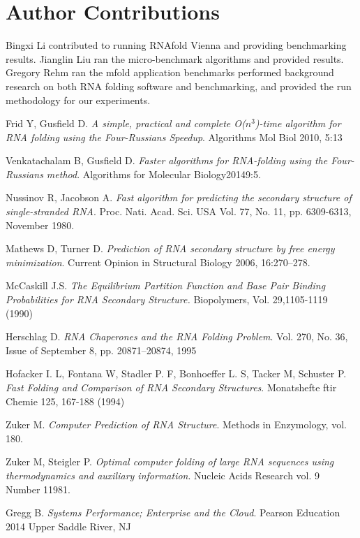 \documentclass[12pt]{article}
\begin{document}
\section{Author Contributions}
Bingxi Li contributed to running RNAfold Vienna and providing benchmarking results. Jianglin Liu ran the
micro-benchmark algorithms and provided results. Gregory Rehm ran the mfold application benchmarks
performed background research on both RNA folding software and benchmarking, and provided the run methodology
for our experiments.
\begin{thebibliography}{56}
Frid Y, Gusfield D.
\textit{A simple, practical and complete O($n^3$)-time
algorithm for RNA folding using the Four-Russians Speedup}.
Algorithms Mol Biol 2010, 5:13

Venkatachalam B, Gusfield D.
\textit{Faster algorithms for RNA-folding using the Four-Russians method}.
Algorithms for Molecular Biology20149:5.

Nussinov R, Jacobson A.
\textit{Fast algorithm for predicting the secondary structure of
single-stranded RNA}.
Proc. Nati. Acad. Sci. USA Vol. 77, No. 11, pp. 6309-6313, November 1980.

Mathews D, Turner D.
\textit{Prediction of RNA secondary structure by free energy
minimization}.
Current Opinion in Structural Biology 2006, 16:270–278.

McCaskill J.S.
\textit{The Equilibrium Partition Function and Base Pair
Binding Probabilities for RNA Secondary Structure.}
Biopolymers, Vol. 29,1105-1119 (1990)

Herschlag D.
\textit{RNA Chaperones and the RNA Folding Problem}.
Vol. 270, No. 36, Issue of September 8, pp. 20871–20874, 1995

Hofacker I. L, Fontana W, Stadler P. F, Bonhoeffer L. S, Tacker M, Schuster P.
\textit{Fast Folding and Comparison of RNA Secondary Structures}.
Monatshefte ftir Chemie 125, 167-188 (1994)

Zuker M.
\textit{Computer Prediction of RNA Structure}.
Methods in Enzymology, vol. 180.

Zuker M, Steigler P.
\textit{Optimal computer folding of large RNA sequences using thermodynamics and auxiliary information}.
Nucleic Acids Research vol. 9 Number 11981.

Gregg B.
\textit{Systems Performance; Enterprise and the Cloud}.
Pearson Education 2014 Upper Saddle River, NJ


\end{thebibliography}
\end{document}
